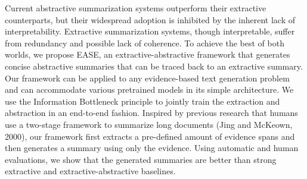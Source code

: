 Current abstractive summarization systems outperform their extractive counterparts, but their widespread adoption is inhibited by the inherent lack of interpretability. Extractive summarization systems, though interpretable, suffer from redundancy and possible lack of coherence. To achieve the best of both worlds, we propose EASE, an extractive-abstractive framework that generates concise abstractive summaries that can be traced back to an extractive summary. Our framework can be applied to any evidence-based text generation problem and can accommodate various pretrained models in its simple architecture.  We use the Information Bottleneck principle to jointly train the  extraction and abstraction in an end-to-end fashion. Inspired by previous research that humans use a two-stage framework to summarize long documents (Jing and McKeown, 2000), our framework first extracts a pre-defined amount of evidence spans and then generates a summary using only the evidence. Using automatic and human evaluations, we show that the generated summaries are better than strong extractive and extractive-abstractive baselines.
